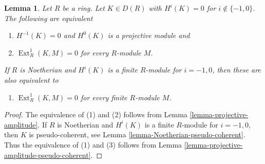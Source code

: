 \documentclass[10pt,a4paper]{amsart}
\theoremstyle{plain}
\newtheorem{lemma}[subsection]{Lemma}
\theoremstyle{definition}
\theoremstyle{remark}
\numberwithin{equation}{subsection}
\def\Ext{\mathop{\mathrm{Ext}}\nolimits}
\begin{document}
\begin{lemma}
\label{lemma-ext-1-zero}
Let $R$ be a ring. Let $K \in D(R)$ with $H^i(K) = 0$ for
$i \not \in \{-1, 0\}$. The following are equivalent
\begin{enumerate}
\item $H^{-1}(K) = 0$ and $H^0(K)$ is a projective module and
\item $\Ext^1_R(K, M) = 0$ for every $R$-module $M$.
\end{enumerate}
If $R$ is Noetherian and $H^i(K)$ is a finite $R$-module for
$i = -1, 0$, then these are also equivalent to
\begin{enumerate}
\item[(3)] $\Ext^1_R(K, M) = 0$ for every finite $R$-module $M$.
\end{enumerate}
\end{lemma}


\begin{proof}
The equivalence of (1) and (2) follows from
Lemma \ref{lemma-projective-amplitude}.
If $R$ is Noetherian and $H^i(K)$ is a finite $R$-module for
$i = -1, 0$, then $K$ is pseudo-coherent, see
Lemma \ref{lemma-Noetherian-pseudo-coherent}.
Thus the equivalence of (1) and (3) follows from
Lemma \ref{lemma-projective-amplitude-pseudo-coherent}.
\end{proof}
\end{document}
